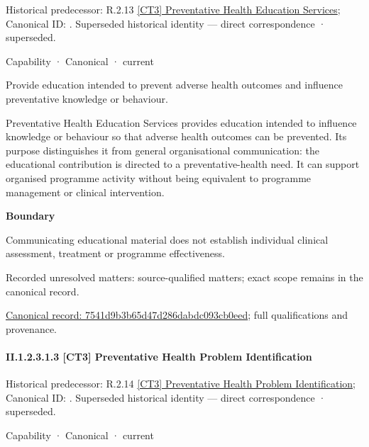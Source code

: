 {\small Historical predecessor: R.2.13 \hyperref[element:dbe10959237f405caeadef2a5748303a]{[CT3] Preventative Health Education Services}; Canonical ID: \texttt{}. Superseded historical identity — direct correspondence · superseded.}\par
\label{element:7541d9b3b65d47d286dabdc093cb0eed}
{\small Capability · Canonical · current}\par

Provide education intended to prevent adverse health outcomes and influence preventative knowledge or behaviour.



Preventative Health Education Services provides education intended to influence knowledge or behaviour so that adverse health outcomes can be prevented. Its purpose distinguishes it from general organisational communication: the educational contribution is directed to a preventative-health need. It can support organised programme activity without being equivalent to programme management or clinical intervention.



\textbf{Boundary}



Communicating educational material does not establish individual clinical assessment, treatment or programme effectiveness.


{\small Recorded unresolved matters: source-qualified matters; exact scope remains in the canonical record.}\par
{\footnotesize \href{../../../../continuum/strategy/capability/7541d9b3b65d47d286dabdc093cb0eed.md}{Canonical record: 7541d9b3b65d47d286dabdc093cb0eed}; full qualifications and provenance.}\par
\paragraph*{II.1.2.3.1.3 [CT3] Preventative Health Problem Identification}
\label{navigation:II.1.2.3.1.3}

{\small Historical predecessor: R.2.14 \hyperref[element:b35d3521141c419fb676a79b2ede40bd]{[CT3] Preventative Health Problem Identification}; Canonical ID: \texttt{}. Superseded historical identity — direct correspondence · superseded.}\par
\label{element:c1567022671f433fa1eeb37a9d156d92}
{\small Capability · Canonical · current}\par

